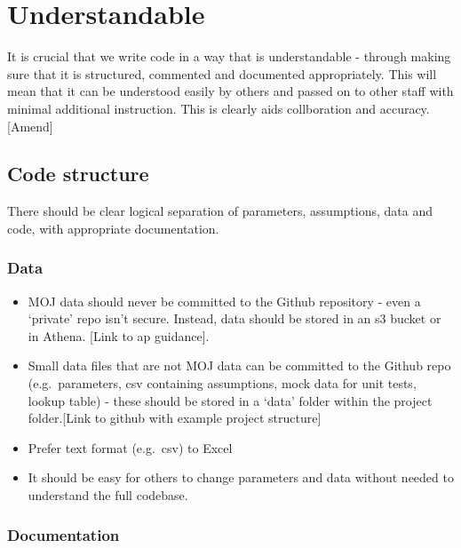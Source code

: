 \documentclass[]{book}
\begin{document}
\hypertarget{understand}{%
\chapter{Understandable}\label{understand}}

It is crucial that we write code in a way that is understandable - through making sure that it is structured, commented and documented appropriately. This will mean that it can be understood easily by others and passed on to other staff with minimal additional instruction. This is clearly aids collboration and accuracy. {[}Amend{]}

\hypertarget{structure2}{%
\section{Code structure}\label{structure2}}

There should be clear logical separation of parameters, assumptions, data and code, with appropriate documentation.

\hypertarget{data}{%
\subsection*{Data}\label{data}}

\begin{itemize}
\item
  MOJ data should never be committed to the Github repository - even a `private' repo isn't secure. Instead, data should be stored in an s3 bucket or in Athena. {[}Link to ap guidance{]}.
\item
  Small data files that are not MOJ data can be committed to the Github repo (e.g.~parameters, csv containing assumptions, mock data for unit tests, lookup table) - these should be stored in a `data' folder within the project folder.{[}Link to github with example project structure{]}
\item
  Prefer text format (e.g.~csv) to Excel\\
\item
  It should be easy for others to change parameters and data without needed to understand the full codebase.
\end{itemize}

\hypertarget{readme}{%
\subsection*{Documentation}\label{readme}}
\end{document}
